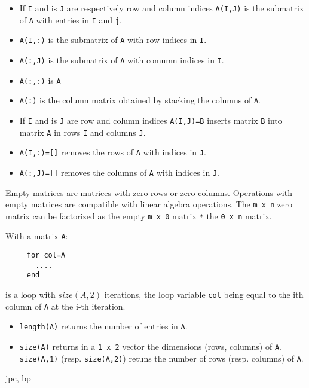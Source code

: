 \begin{itemize}
   \item If \verb+I+ and is \verb+J+ are respectively row and column indices \verb+A(I,J)+ is the submatrix of \verb+A+ with entries in \verb+I+ and \verb+j+.
   \item \verb+A(I,:)+ is the submatrix of \verb+A+ with row indices in \verb+I+.
   \item \verb+A(:,J)+ is the submatrix of \verb+A+ with comumn indices in \verb+I+.
   \item \verb+A(:,:)+ is \verb+A+
   \item \verb+A(:)+  is the column matrix obtained by stacking the columns of \verb+A+.
\end{itemize}
\begin{itemize}
   \item If \verb+I+ and is \verb+J+ are row and column indices \verb+A(I,J)=B+ inserts
matrix \verb+B+ into matrix \verb+A+ in rows \verb+I+ and columns \verb!J!.
   \item \verb+A(I,:)=[]+ removes the rows of \verb+A+ with indices in \verb+J+.
   \item \verb+A(:,J)=[]+ removes the columns of \verb+A+ with indices in \verb+J+.
\end{itemize}

Empty matrices are matrices with zero rows or zero columns. Operations with empty matrices
are compatible with linear algebra operations. The \verb+m x n+ zero matrix can be 
factorized as the empty \verb+m x 0+ matrix \verb+*+ the \verb+0 x n+ matrix. 

With a matrix \verb+A+:
\begin{verbatim}
     for col=A
       ....
     end
\end{verbatim} 
is a loop with $size(A,2)$ iterations, the loop 
variable  \verb+col+ being equal to the ith column of \verb+A+ at the i-th iteration.

\begin{itemize}
   \item \verb+length(A)+ returns the number of entries in \verb+A+.
   \item \verb+size(A)+ returns in a \verb+1 x 2+ vector the dimensions (rows, columns)
of \verb+A+. \verb+size(A,1)+ (resp. \verb+size(A,2)+) retuns the number of rows 
(resp. columns) of \verb+A+.
\end{itemize}


\begin{manseealso}

\end{manseealso}

\begin{authors}
   jpc, bp
\end{authors}
